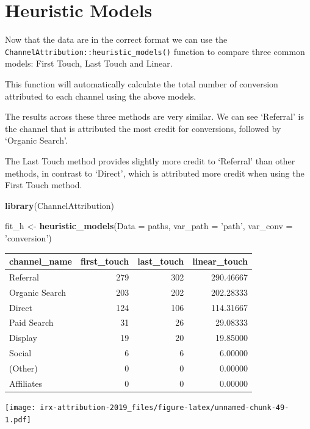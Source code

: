 \documentclass[]{book}
\newenvironment{Shaded}{\begin{snugshade}}{\end{snugshade}}
\newcommand{\KeywordTok}[1]{\textcolor[rgb]{0.13,0.29,0.53}{\textbf{#1}}}
\newcommand{\DataTypeTok}[1]{\textcolor[rgb]{0.13,0.29,0.53}{#1}}
\newcommand{\StringTok}[1]{\textcolor[rgb]{0.31,0.60,0.02}{#1}}
\newcommand{\NormalTok}[1]{#1}
\begin{document}
\section{Heuristic Models}\label{heuristic-models-1}

Now that the data are in the correct format we can use the
\texttt{ChannelAttribution::heuristic\_models()} function to compare
three common models: First Touch, Last Touch and Linear.

This function will automatically calculate the total number of
conversion attributed to each channel using the above models.

The results across these three methods are very similar. We can see
`Referral' is the channel that is attributed the most credit for
conversions, followed by `Organic Search'.

The Last Touch method provides slightly more credit to `Referral' than
other methods, in contrast to `Direct', which is attributed more credit
when using the First Touch method.

\begin{Shaded}
\begin{Highlighting}[]
\KeywordTok{library}\NormalTok{(ChannelAttribution)}

\NormalTok{fit_h <-}\StringTok{ }\KeywordTok{heuristic_models}\NormalTok{(}\DataTypeTok{Data =}\NormalTok{ paths, }\DataTypeTok{var_path =} \StringTok{'path'}\NormalTok{, }\DataTypeTok{var_conv =} \StringTok{'conversion'}\NormalTok{)}
\end{Highlighting}
\end{Shaded}

\begin{tabular}{l|r|r|r}
\hline
channel\_name & first\_touch & last\_touch & linear\_touch\\
\hline
Referral & 279 & 302 & 290.46667\\
\hline
Organic Search & 203 & 202 & 202.28333\\
\hline
Direct & 124 & 106 & 114.31667\\
\hline
Paid Search & 31 & 26 & 29.08333\\
\hline
Display & 19 & 20 & 19.85000\\
\hline
Social & 6 & 6 & 6.00000\\
\hline
(Other) & 0 & 0 & 0.00000\\
\hline
Affiliates & 0 & 0 & 0.00000\\
\hline
\end{tabular}

\texttt{[image: irx-attribution-2019\_files/figure-latex/unnamed-chunk-49-1.pdf]}
\end{document}
